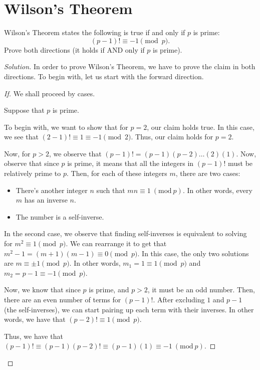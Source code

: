 \documentclass{article}
\newenvironment{solution}{\begin{proof}[Solution]}{\end{proof}}
\newcommand{\Mod}[1]{\ (\mathrm{mod}\ {#1})}
\begin{document}
\section{Wilson's Theorem}
\begin{hw}
	Wilson's Theorem states the following is true if and only if $p$ is prime:
	\[(p - 1)! \equiv -1 \pmod{p}.\]
	Prove both directions (it holds if AND only if $p$ is prime).
\end{hw}
\begin{solution}
	In order to prove Wilson's Theorem, we have to prove the claim in both directions. To begin with, let us start with the forward direction.
	
	\begin{proof}[If] We shall proceed by cases.
		
		Suppose that $p$ is prime.
		
		To begin with, we want to show that for $p=2$, our claim holds true. In this case, we see that $(2-1)! \equiv 1 \equiv -1 \pmod 2$. Thus, our claim holds for $p=2$.
		
		Now, for $p>2$, we observe that $(p-1)! = (p-1)(p-2) \ldots (2)(1)$. Now, observe that since $p$ is prime, it means that all the integers in $(p-1)!$ must be relatively prime to $p$. Then, for each of these integers $m$, there are two cases:
		\begin{itemize}
			\item There's another integer $n$ such that $mn \equiv 1 \Mod{p}$. In other words, every $m$ has an inverse $n$.
			
			\item The number is a self-inverse.
		\end{itemize}
	
		In the second case, we observe that finding self-inverses is equivalent to solving for $m^{2} \equiv 1 \pmod p$. We can rearrange it to get that $m^{2} - 1 = (m+1)(m-1) \equiv 0 \pmod p$. In this case, the only two solutions are $m \equiv \pm 1 \pmod p$. In other words, $m_{1} = 1 \equiv 1 \pmod p$ and $m_{2} = p-1 \equiv -1 \pmod p$.
		
		Now, we know that since $p$ is prime, and $p>2$, it must be an odd number. Then, there are an even number of terms for $(p-1)!$. After excluding $1$ and $p-1$ (the self-inverses), we can start pairing up each term with their inverses. In other words, we have that $(p-2)! \equiv 1 \pmod p$.
		
		Thus, we have that $(p-1)! \equiv (p-1)(p-2)! \equiv (p-1)(1) \equiv -1 \Mod{p}$.
		

\end{proof}
\end{solution}
\end{document}
